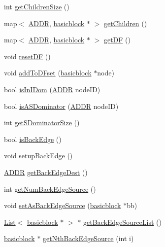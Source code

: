 \begin{DoxyCompactItemize}
\item 
int \hyperlink{classbasicblock_a150ce672b4864265713b242b74b3ca30}{getChildrenSize} ()
\item 
map$<$ \hyperlink{binaryTranslator_2global_8h_a8bb6b77b3aab51e3a8d1866dd5861225}{ADDR}, \hyperlink{classbasicblock}{basicblock} $\ast$ $>$ \hyperlink{classbasicblock_a6dde8501c965eb860dcc5bf63fcb06f2}{getChildren} ()
\item 
map$<$ \hyperlink{binaryTranslator_2global_8h_a8bb6b77b3aab51e3a8d1866dd5861225}{ADDR}, \hyperlink{classbasicblock}{basicblock} $\ast$ $>$ \hyperlink{classbasicblock_a3f8fdaf67559becd35119c53a47791c6}{getDF} ()
\item 
void \hyperlink{classbasicblock_a7a9a81a5902f8cddcc52edadd266d703}{resetDF} ()
\item 
void \hyperlink{classbasicblock_abfaebb9413fe26d42607c09949e9d5cb}{addToDFset} (\hyperlink{classbasicblock}{basicblock} $\ast$node)
\item 
bool \hyperlink{classbasicblock_a026b949adeca19875d0a8a43784d2c9d}{isInIDom} (\hyperlink{binaryTranslator_2global_8h_a8bb6b77b3aab51e3a8d1866dd5861225}{ADDR} nodeID)
\item 
bool \hyperlink{classbasicblock_ab16dc9da49df4b6bf4c6573bfb31217a}{isASDominator} (\hyperlink{binaryTranslator_2global_8h_a8bb6b77b3aab51e3a8d1866dd5861225}{ADDR} nodeID)
\item 
int \hyperlink{classbasicblock_ab3f5925d649492e0a3e73f4f9075ca7d}{getSDominatorSize} ()
\item 
bool \hyperlink{classbasicblock_a0da29a0f57618d2a13bfdfc9926319b9}{isBackEdge} ()
\item 
void \hyperlink{classbasicblock_a46149b611069f8c2f1328311ea4b7803}{setupBackEdge} ()
\item 
\hyperlink{binaryTranslator_2global_8h_a8bb6b77b3aab51e3a8d1866dd5861225}{ADDR} \hyperlink{classbasicblock_a0aa9e7f9af5171d5cd4bad3503cc45c8}{getBackEdgeDest} ()
\item 
int \hyperlink{classbasicblock_a4e6b8abafbdff3155477bdefd7546ef9}{getNumBackEdgeSource} ()
\item 
void \hyperlink{classbasicblock_a26f134ff2983953107999162e764c52a}{setAsBackEdgeSource} (\hyperlink{classbasicblock}{basicblock} $\ast$bb)
\item 
\hyperlink{classList}{List}$<$ \hyperlink{classbasicblock}{basicblock} $\ast$ $>$ $\ast$ \hyperlink{classbasicblock_a20313080c67808c6db8fc8c311ba5165}{getBackEdgeSourceList} ()
\item 
\hyperlink{classbasicblock}{basicblock} $\ast$ \hyperlink{classbasicblock_a7c5a3da3287691450420e3a6cf3105b1}{getNthBackEdgeSource} (int i)

\end{DoxyCompactItemize}
